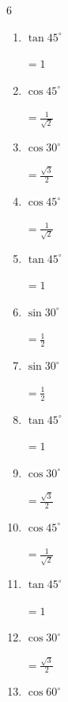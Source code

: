 \begin{multicols}{6}
\begin{enumerate}
        $\displaystyle =\frac{1}{2}$

  \item $\displaystyle \tan{45^\circ}$

        $\displaystyle =1$

  \item $\displaystyle \cos{45^\circ}$

        $\displaystyle =\frac{1}{\sqrt{2}}$

  \item $\displaystyle \cos{30^\circ}$

        $\displaystyle =\frac{\sqrt{3}}{2}$

  \item $\displaystyle \cos{45^\circ}$

        $\displaystyle =\frac{1}{\sqrt{2}}$

  \item $\displaystyle \tan{45^\circ}$

        $\displaystyle =1$

  \item $\displaystyle \sin{30^\circ}$

        $\displaystyle =\frac{1}{2}$

  \item $\displaystyle \sin{30^\circ}$

        $\displaystyle =\frac{1}{2}$

  \item $\displaystyle \tan{45^\circ}$

        $\displaystyle =1$

  \item $\displaystyle \cos{30^\circ}$

        $\displaystyle =\frac{\sqrt{3}}{2}$

\columnbreak %

  \item $\displaystyle \cos{45^\circ}$

        $\displaystyle =\frac{1}{\sqrt{2}}$

  \item $\displaystyle \tan{45^\circ}$

        $\displaystyle =1$

  \item $\displaystyle \cos{30^\circ}$

        $\displaystyle =\frac{\sqrt{3}}{2}$

  \item $\displaystyle \cos{60^\circ}$


\end{enumerate}
\end{multicols}
